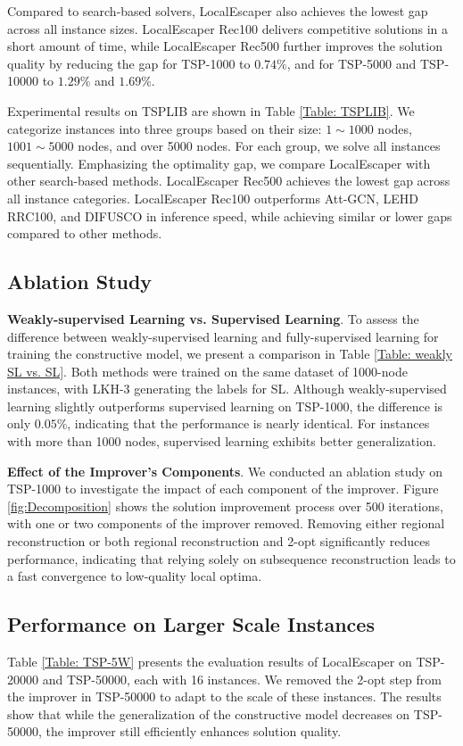 Compared to search-based solvers, LocalEscaper also achieves the lowest gap across all instance sizes. LocalEscaper Rec100 delivers  competitive solutions in a short amount of time, while LocalEscaper Rec500 further improves the solution quality by reducing the gap for TSP-1000 to $0.74\%$, and for TSP-5000 and TSP-10000 to $1.29\%$ and $1.69\%$. 


Experimental results on TSPLIB are shown in Table \ref{Table: TSPLIB}. We categorize instances into three groups based on their size: $1\sim1000$ nodes, $1001\sim5000$ nodes, and over 5000 nodes. For each group, we solve all instances sequentially. 
Emphasizing the optimality gap, we compare LocalEscaper with other search-based methods. LocalEscaper Rec500 achieves the lowest gap across all instance categories. LocalEscaper Rec100 outperforms Att-GCN, LEHD RRC100, and DIFUSCO in inference speed, while achieving similar or lower gaps compared to other methods. 




% 


\subsection{Ablation Study} 
\textbf{Weakly-supervised Learning vs. Supervised Learning}.  
To assess the difference between weakly-supervised learning and fully-supervised learning for training the constructive model, we present a comparison in Table \ref{Table: weakly SL vs. SL}. 
Both methods were trained on the same dataset of 1000-node instances, with LKH-3 generating the labels for SL.  
Although weakly-supervised learning slightly outperforms supervised learning on TSP-1000, the difference is only $0.05\%$, indicating that the performance is %
nearly identical.  For instances with more than 1000 nodes, supervised learning exhibits better generalization.

\textbf{Effect of the Improver's Components}. 
We conducted an ablation study on TSP-1000 to investigate the impact of each component of the improver.  
Figure \ref{fig:Decomposition} shows the solution improvement process over 500 iterations, with one or two components of the improver removed. Removing either regional reconstruction or both regional reconstruction and 2-opt significantly reduces performance, indicating that relying solely on subsequence reconstruction leads to a fast convergence to low-quality local optima.

\subsection{Performance on Larger Scale Instances} 
Table \ref{Table: TSP-5W} presents the evaluation results of LocalEscaper on TSP-20000 and TSP-50000, each with 16 instances. We removed the 2-opt step from the improver in TSP-50000 to adapt to the scale of these instances. The results show that while the generalization of the constructive model decreases on TSP-50000,  the improver still efficiently enhances solution quality. 


